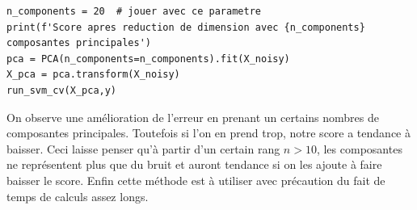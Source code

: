 \documentclass[10pt,a4paper]{article}
\begin{document}
\begin{lstlisting}
n_components = 20  # jouer avec ce parametre
print(f'Score apres reduction de dimension avec {n_components} composantes principales')
pca = PCA(n_components=n_components).fit(X_noisy)
X_pca = pca.transform(X_noisy)
run_svm_cv(X_pca,y)
\end{lstlisting}

On observe une amélioration de l'erreur en prenant un certains nombres de composantes principales. Toutefois si l'on en prend trop, notre score a tendance à baisser. Ceci laisse penser qu'à partir d'un certain rang $n>10$, les composantes ne représentent plus que du bruit et auront tendance si on les ajoute à faire baisser le score. Enfin cette méthode est à utiliser avec précaution du fait de temps de calculs assez longs.
\end{document}
